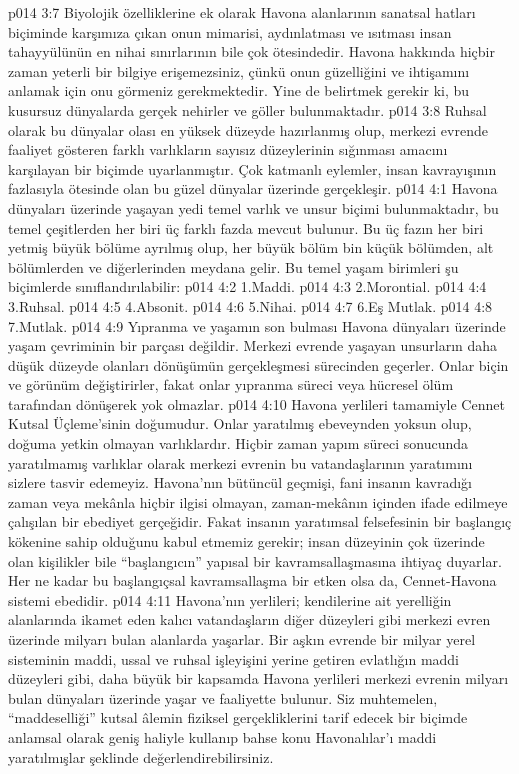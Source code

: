 \vs p014 3:7 Biyolojik özelliklerine ek olarak Havona alanlarının sanatsal hatları biçiminde karşımıza çıkan onun mimarisi, aydınlatması ve ısıtması insan tahayyülünün en nihai sınırlarının bile çok ötesindedir. Havona hakkında hiçbir zaman yeterli bir bilgiye erişemezsiniz, çünkü onun güzelliğini ve ihtişamını anlamak için onu görmeniz gerekmektedir. Yine de belirtmek gerekir ki, bu kusursuz dünyalarda gerçek nehirler ve göller bulunmaktadır.
\vs p014 3:8 Ruhsal olarak bu dünyalar olası en yüksek düzeyde hazırlanmış olup, merkezi evrende faaliyet gösteren farklı varlıkların sayısız düzeylerinin sığınması amacını karşılayan bir biçimde uyarlanmıştır. Çok katmanlı eylemler, insan kavrayışının fazlasıyla ötesinde olan bu güzel dünyalar üzerinde gerçekleşir.
\vs p014 4:1 Havona dünyaları üzerinde yaşayan yedi temel varlık ve unsur biçimi bulunmaktadır, bu temel çeşitlerden her biri üç farklı fazda mevcut bulunur. Bu üç fazın her biri yetmiş büyük bölüme ayrılmış olup, her büyük bölüm bin küçük bölümden, alt bölümlerden ve diğerlerinden meydana gelir. Bu temel yaşam birimleri şu biçimlerde sınıflandırılabilir:
\vs p014 4:2 1.\bibnobreakspace Maddi.
\vs p014 4:3 2.\bibnobreakspace Morontial.
\vs p014 4:4 3.\bibnobreakspace Ruhsal.
\vs p014 4:5 4.\bibnobreakspace Absonit.
\vs p014 4:6 5.\bibnobreakspace Nihai.
\vs p014 4:7 6.\bibnobreakspace Eş Mutlak.
\vs p014 4:8 7.\bibnobreakspace Mutlak.
\vs p014 4:9 Yıpranma ve yaşamın son bulması Havona dünyaları üzerinde yaşam çevriminin bir parçası değildir. Merkezi evrende yaşayan unsurların daha düşük düzeyde olanları dönüşümün gerçekleşmesi sürecinden geçerler. Onlar biçin ve görünüm değiştirirler, fakat onlar yıpranma süreci veya hücresel ölüm tarafından dönüşerek yok olmazlar.
\vs p014 4:10 Havona yerlileri tamamiyle Cennet Kutsal Üçleme’sinin doğumudur. Onlar yaratılmış ebeveynden yoksun olup, doğuma yetkin olmayan varlıklardır. Hiçbir zaman yapım süreci sonucunda yaratılmamış varlıklar olarak merkezi evrenin bu vatandaşlarının yaratımını sizlere tasvir edemeyiz. Havona’nın bütüncül geçmişi, fani insanın kavradığı zaman veya mekânla hiçbir ilgisi olmayan, zaman\hyp{}mekânın içinden ifade edilmeye çalışılan bir ebediyet gerçeğidir. Fakat insanın yaratımsal felsefesinin bir başlangıç kökenine sahip olduğunu kabul etmemiz gerekir; insan düzeyinin çok üzerinde olan kişilikler bile “başlangıcın” yapısal bir kavramsallaşmasına ihtiyaç duyarlar. Her ne kadar bu başlangıçsal kavramsallaşma bir etken olsa da, Cennet\hyp{}Havona sistemi ebedidir.
\vs p014 4:11 Havona’nın yerlileri; kendilerine ait yerelliğin alanlarında ikamet eden kalıcı vatandaşların diğer düzeyleri gibi merkezi evren üzerinde milyarı bulan alanlarda yaşarlar. Bir aşkın evrende bir milyar yerel sisteminin maddi, ussal ve ruhsal işleyişini yerine getiren evlatlığın maddi düzeyleri gibi, daha büyük bir kapsamda Havona yerlileri merkezi evrenin milyarı bulan dünyaları üzerinde yaşar ve faaliyette bulunur. Siz muhtemelen, “maddeselliği” kutsal âlemin fiziksel gerçekliklerini tarif edecek bir biçimde anlamsal olarak geniş haliyle kullanıp bahse konu Havonalılar’ı maddi yaratılmışlar şeklinde değerlendirebilirsiniz.
